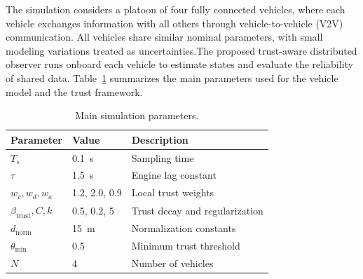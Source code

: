 The simulation considers a platoon of four fully connected vehicles, where each vehicle exchanges information with all others through vehicle-to-vehicle (V2V) communication. 
All vehicles share similar nominal parameters, with small modeling variations treated as uncertainties.The proposed trust-aware distributed observer runs onboard each vehicle to estimate states and evaluate the reliability of shared data. Table~\ref{tab:sim_params} summarizes the main parameters used for the vehicle model and the trust framework.



\begin{table}[h!]
\centering
\caption{Main simulation parameters.}
\label{tab:sim_params}
\begin{tabular}{lll}
\toprule
\textbf{Parameter} & \textbf{Value} & \textbf{Description} \\
\midrule
$T_s$ & 0.1~s & Sampling time \\
$\tau$ & 1.5~s & Engine lag constant \\
$w_v, w_d, w_a$ & 1.2, 2.0, 0.9 & Local trust weights \\
$\beta_{\text{trust}}, C, k$ & 0.5, 0.2, 5 & Trust decay and regularization \\
$d_{\text{norm}}$ & 15~m & Normalization constants \\
$\theta_{\min}$ & 0.5 & Minimum trust threshold \\
$N$ & 4 & Number of vehicles \\
\bottomrule
\end{tabular}
\end{table}

